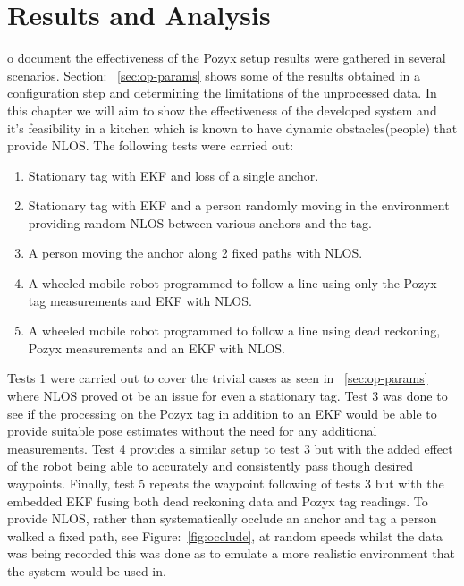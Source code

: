 \chapter{Results and Analysis}\label{ch:results-and-analysis}
o document the effectiveness of the Pozyx setup results were gathered in several scenarios.
Section: ~\ref{sec:op-params} shows some of the results obtained in a configuration step and determining the limitations of the unprocessed data.
In this chapter we will aim to show the effectiveness of the developed system and it's feasibility in a kitchen which is known to have dynamic obstacles(people) that provide NLOS.
The following tests were carried out:
\begin{enumerate}
    \item Stationary tag with EKF and loss of a single anchor.
    \item Stationary tag with EKF and a person randomly moving in the environment providing random NLOS between various anchors and the tag.
    \item A person moving the anchor along 2 fixed paths with NLOS.
    \item A wheeled mobile robot programmed to follow a line using only the Pozyx tag measurements and EKF with NLOS.
    \item A wheeled mobile robot programmed to follow a line using dead reckoning, Pozyx measurements and an EKF with NLOS.
\end{enumerate}


Tests 1 were carried out to cover the trivial cases as seen in ~\ref{sec:op-params} where NLOS proved ot be an issue for even a stationary tag.
Test 3 was done to see if the processing on the Pozyx tag in addition to an EKF would be able to provide suitable pose estimates without the need for any additional measurements.
Test 4 provides a similar setup to test 3 but with the added effect of the robot being able to accurately and consistently pass though desired waypoints.
Finally, test 5 repeats the waypoint following of tests 3 but with the embedded EKF fusing both dead reckoning data and Pozyx tag readings.
To provide NLOS, rather than systematically occlude an anchor and tag a person walked a fixed path, see Figure:~\ref{fig:occlude}, at random speeds whilst the data was being recorded this was done as to emulate a more realistic environment that the system would be used in.

